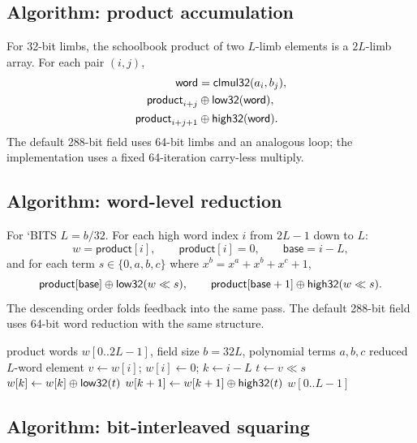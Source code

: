 \documentclass[11pt,a4paper]{article}
\begin{document}
\subsection{Algorithm: product accumulation}

For 32-bit limbs, the schoolbook product of two $L$-limb elements is a
$2L$-limb array. For each pair $(i,j)$,
\begin{align*}
\mathsf{word}&=\mathsf{clmul32}(a_i,b_j),\\
\mathsf{product}_{i+j}&\oplus\mathsf{low32}(\mathsf{word}),\\
\mathsf{product}_{i+j+1}&\oplus\mathsf{high32}(\mathsf{word}).
\end{align*}
The default 288-bit field uses 64-bit limbs and an analogous loop; the
implementation uses a fixed 64-iteration carry-less multiply.

\subsection{Algorithm: word-level reduction}

For `BITS %
$L=b/32$. For each high word index $i$ from $2L-1$ down to $L$:
\[
w=\mathsf{product}[i],\qquad
\mathsf{product}[i]=0,\qquad
\mathsf{base}=i-L,
\]
and for each term $s\in\{0,a,b,c\}$ where
$x^b=x^a+x^b+x^c+1$,
\[
\mathsf{product}[\mathsf{base}]\oplus\mathsf{low32}(w\ll s),\qquad
\mathsf{product}[\mathsf{base}+1]\oplus\mathsf{high32}(w\ll s).
\]
The descending order folds feedback into the same pass. The default 288-bit
field uses 64-bit word reduction with the same structure.

\begin{algorithm}[ht]
\caption{$\mathsf{reduce\_words}(w,b,a,b,c)$}
\label{alg:reduce}
\begin{algorithmic}[1]
\REQUIRE product words $w[0..2L-1]$, field size $b=32L$, polynomial terms $a,b,c$
\ENSURE reduced $L$-word element
  \STATE $v\gets w[i]$; $w[i]\gets0$; $k\gets i-L$
    \STATE $t\gets v\ll s$
    \STATE $w[k]\gets w[k]\oplus\mathsf{low32}(t)$
    \STATE $w[k+1]\gets w[k+1]\oplus\mathsf{high32}(t)$
  \ENDFOR
\ENDFOR
\RETURN $w[0..L-1]$
\end{algorithmic}
\end{algorithm}

\subsection{Algorithm: bit-interleaved squaring}
\end{document}
